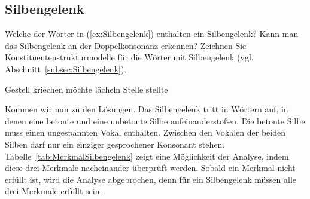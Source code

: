 \subsection{Silbengelenk}

Welche der Wörter in (\ref{ex:Silbengelenk}) enthalten ein Silbengelenk? Kann man das Silbengelenk an der Doppelkonsonanz erkennen? Zeichnen Sie Konstituentenstrukturmodelle für die Wörter mit Silbengelenk (vgl. Abschnitt~\ref{subsec:Silbengelenk}). 

\ea \label{ex:Silbengelenk}
\ea Gestell
\ex kriechen
\ex möchte
\ex lächeln
\ex Stelle
\ex stellte
\z
\z

Kommen wir nun zu den Lösungen. Das Silbengelenk tritt in Wörtern auf, in denen eine betonte und eine unbetonte Silbe aufeinanderstoßen. Die betonte Silbe muss einen ungespannten Vokal enthalten. Zwischen den Vokalen der beiden Silben darf nur ein einziger gesprochener Konsonant stehen. Tabelle~\ref{tab:MerkmalSilbengelenk} zeigt eine Möglichkeit der Analyse, indem diese drei Merkmale nacheinander überprüft werden. Sobald ein Merkmal nicht erfüllt ist, wird die Analyse abgebrochen, denn für ein Silbengelenk müssen alle drei Merkmale erfüllt sein.

\begin{table}
\centering
\caption{Voraussetzungen für das Auftreten eines Silbengelenks: eine unbetonte Silbe muss auf eine betonte folgen (\textit{bet. --unbet.}), der Vokal in der ersten Silbe muss ungespannt sein, zwischen den beiden Vokalen darf nur ein gesprochener Konsonant stehen \label{tab:MerkmalSilbengelenk}}
\end{table}

